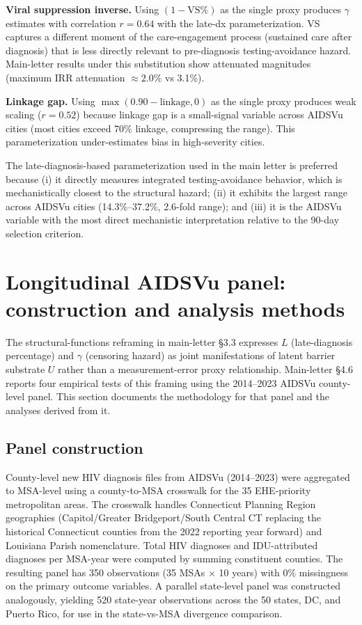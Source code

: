 \documentclass[11pt]{article}
\begin{document}
\textbf{Viral suppression inverse.} Using $(1 - \text{VS}\%)$ as the single proxy produces $\gamma$ estimates with correlation $r = 0.64$ with the late-dx parameterization. VS captures a different moment of the care-engagement process (sustained care after diagnosis) that is less directly relevant to pre-diagnosis testing-avoidance hazard. Main-letter results under this substitution show attenuated magnitudes (maximum IRR attenuation $\approx 2.0\%$ vs 3.1\%).

\textbf{Linkage gap.} Using $\max(0.90 - \text{linkage}, 0)$ as the single proxy produces weak scaling ($r = 0.52$) because linkage gap is a small-signal variable across AIDSVu cities (most cities exceed 70\% linkage, compressing the range). This parameterization under-estimates bias in high-severity cities.

The late-diagnosis-based parameterization used in the main letter is preferred because (i) it directly measures integrated testing-avoidance behavior, which is mechanistically closest to the structural hazard; (ii) it exhibits the largest range across AIDSVu cities (14.3\%--37.2\%, 2.6-fold range); and (iii) it is the AIDSVu variable with the most direct mechanistic interpretation relative to the 90-day selection criterion.
\section{Longitudinal AIDSVu panel: construction and analysis methods}\label{sec:longitudinal}

The structural-functions reframing in main-letter §3.3 expresses $L$ (late-diagnosis percentage) and $\gamma$ (censoring hazard) as joint manifestations of latent barrier substrate $U$ rather than a measurement-error proxy relationship. Main-letter §4.6 reports four empirical tests of this framing using the 2014--2023 AIDSVu county-level panel. This section documents the methodology for that panel and the analyses derived from it.

\subsection{Panel construction}\label{sec:panel_construction}

County-level new HIV diagnosis files from AIDSVu (2014--2023) were aggregated to MSA-level using a county-to-MSA crosswalk for the 35 EHE-priority metropolitan areas. The crosswalk handles Connecticut Planning Region geographies (Capitol/Greater Bridgeport/South Central CT replacing the historical Connecticut counties from the 2022 reporting year forward) and Louisiana Parish nomenclature. Total HIV diagnoses and IDU-attributed diagnoses per MSA-year were computed by summing constituent counties. The resulting panel has 350 observations (35 MSAs $\times$ 10 years) with 0\% missingness on the primary outcome variables. A parallel state-level panel was constructed analogously, yielding 520 state-year observations across the 50 states, DC, and Puerto Rico, for use in the state-vs-MSA divergence comparison.
\end{document}
